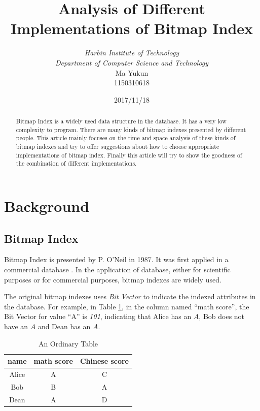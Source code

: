 \documentclass[12pt, a4paper]{article}
\begin{document}
\title{{\bf\Huge Analysis of Different Implementations of Bitmap Index}}
\author{\emph{Harbin Institute of Technology}\\\emph{Department of Computer Science and Technology}\\Ma Yukun\\1150310618}

\date{2017/11/18}

\maketitle\setcounter{page}{0}\thispagestyle{empty}
\newpage

\begin{abstract}
  Bitmap Index is a widely used data structure in the database. It has a very low complexity to program. There are many kinds of bitmap indexes presented by different people. This article mainly focuses on the time and space analysis of these kinds of bitmap indexes and try to offer suggestions about how to choose appropriate implementations of bitmap index. Finally this article will try to show the goodness of the combination of different implementations.
\end{abstract}

\section{Background}

\subsection{Bitmap Index}

Bitmap Index is presented by P. O'Neil in 1987. It was first applied in a commercial database \citep{spiegler1985storage}. In the application of database, either for scientific purposes or for commercial purposes, bitmap indexes are widely used.

The original bitmap indexes uses {\emph{Bit Vector}} to indicate the indexed attributes in the database. For example, in Table \ref{tab:ordinary-table}, in the column named ``math score'', the Bit Vector for value ``A'' is {\emph{101}}, indicating that Alice has an $A$, Bob does not have an $A$ and Dean has an $A$.

\begin{table}[H]
\centering
\caption{An Ordinary Table}\label{tab:ordinary-table}
\begin{tabular}{ccc}
\toprule
name  & math score & Chinese score \\
\midrule
Alice & A          & C             \\
Bob   & B          & A             \\
Dean  & A          & D             \\
\bottomrule
\end{tabular}
\end{table}
\end{document}

